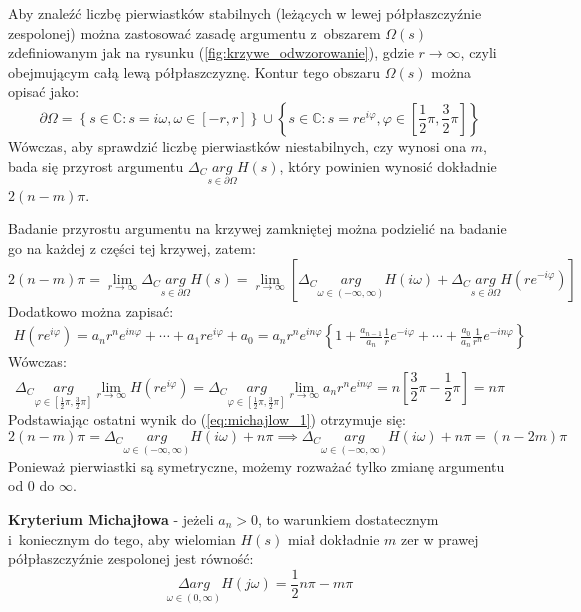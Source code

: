 \documentclass{article}
\begin{document}
    Aby znaleźć liczbę pierwiastków stabilnych (leżących w lewej półpłaszczyźnie zespolonej) można zastosować zasadę argumentu z~obszarem $\Omega(s)$ zdefiniowanym jak na rysunku (\ref{fig:krzywe_odwzorowanie}), gdzie $r \rightarrow \infty$, czyli obejmującym całą lewą półpłaszczyznę.
    Kontur tego obszaru $\Omega(s)$ można opisać jako:
    $$
        \partial \Omega = \left\{ s \in \mathbb{C}: s = i\omega,\omega \in [-r,r] \right\} \cup \left\{ s\in \mathbb{C}: s=re^{i\varphi},\varphi \in [\frac{1}{2}\pi, \frac{3}{2}\pi] \right\}
    $$
    Wówczas, aby sprawdzić liczbę pierwiastków niestabilnych, czy wynosi ona $m$, bada się przyrost argumentu $\Delta_{C} \underset{s\in\partial\Omega}{arg} H(s)$, który powinien wynosić dokładnie $2(n-m)\pi$.

    Badanie przyrostu argumentu na krzywej zamkniętej można podzielić na badanie go na każdej z części tej krzywej, zatem:
    \begin{equation}\label{eq:michajlow_1}
        2(n-m)\pi = \lim_{r\rightarrow\infty}\Delta_{C}\underset{s\in\partial\Omega}{arg}H(s) = 
        \lim_{r\rightarrow\infty}[\Delta_{C} \underset{\omega\in (-\infty,\infty)}{arg} H(i\omega) + \Delta_{C}\underset{s\in\partial\Omega}{arg}H(re^{-i\varphi})]
    \end{equation}
    Dodatkowo można zapisać:
    $$
        \begin{array}{c}
        H(re^{i\varphi}) = a_{n}r^{n}e^{in\varphi} + \cdots + a_{1}re^{i\varphi} + a_{0} = 
        a_{n}r^{n}e^{in\varphi} \left\{ 1 + \frac{a_{n-1}}{a_{n}}\frac{1}{r}e^{-i\varphi} + \cdots + \frac{a_{0}}{a_{n}}\frac{1}{r^{n}}e^{-in\varphi} \right\}
        \end{array}
    $$
    Wówczas:
    $$
        \Delta_{C} \underset{\varphi\in[\frac{1}{2}\pi,\frac{3}{2}\pi]}{arg} \lim_{r\rightarrow\infty} H(re^{i\varphi}) =
        \Delta_{C}\underset{\varphi\in[\frac{1}{2}\pi,\frac{3}{2}\pi]}{arg} \lim_{r\rightarrow\infty} a_{n}r^{n}e^{in\varphi} =
        n[\frac{3}{2}\pi-\frac{1}{2}\pi] = n\pi
    $$
    Podstawiając ostatni wynik do (\ref{eq:michajlow_1}) otrzymuje się:
    $$
        2(n-m)\pi = \Delta_{C} \underset{\omega\in (-\infty,\infty)}{arg} H(i\omega) + n\pi
        \implies
        \Delta_{C} \underset{\omega\in (-\infty,\infty)}{arg} H(i\omega) + n\pi = (n-2m)\pi
    $$
    Ponieważ pierwiastki są symetryczne, możemy rozważać tylko zmianę argumentu od $0$ do $\infty$.

    \textbf{Kryterium Michajłowa} - jeżeli $a_{n} > 0$, to warunkiem dostatecznym i~koniecznym do tego, aby wielomian $H(s)$ miał dokładnie $m$ zer w prawej półpłaszczyźnie zespolonej jest równość:
    \begin{equation}\label{eq:kryterium_michajlowa}
         \underset{\omega \in (0, \infty)}{\Delta arg} H(j\omega) = \frac{1}{2}n\pi - m\pi
    \end{equation}
\end{document}
